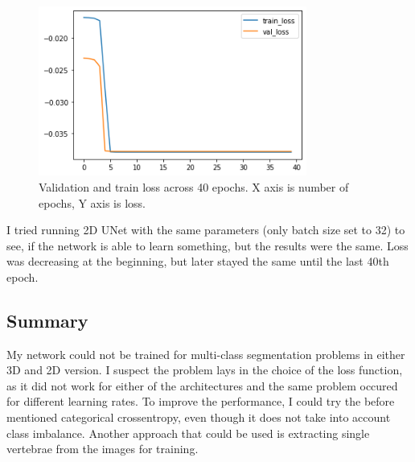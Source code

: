 \begin{figure}[ht!]
    \centering
    \includegraphics[width=250pt]{images/plot_loss.png}
    \caption[Validation loss]{Validation and train loss across 40 epochs. X axis is number of epochs, Y axis is loss.}
    \label{fig:loss}
\end{figure}

I tried running 2D UNet with the same parameters (only batch size set to 32) to see, if the network is able to learn something, but the results were the same. Loss was decreasing at the beginning, but later stayed the same until the last 40th epoch.

\subsection{Summary}
My network could not be trained for multi-class segmentation problems in either 3D and 2D version. I suspect the problem lays in the choice of the loss function, as it did not work for either of the architectures and the same problem occured for different learning rates. To improve the performance, I could try the before mentioned categorical crossentropy, even though it does not take into account class imbalance. Another approach that could be used is extracting single vertebrae from the images for training.  

